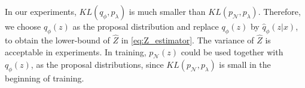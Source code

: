 In our experiments, $KL(q_\phi, p_\lambda)$ is much smaller than $KL(p_\mathcal{N}, p_\lambda)$. Therefore, we choose $q_\phi(z)$ as the proposal distribution and replace $q_\phi(z)$ by $\hat{q}_\phi(z|x)$, to obtain the lower-bound of $\hat{Z}$ in \cref{eq:Z_estimator}. The variance of $\hat{Z}$ is acceptable in experiments.  
In training, $p_\mathcal{N}(z)$ could be used together with $q_\phi(z)$, as the proposal distributions, since $KL(p_\mathcal{N}, p_\lambda)$ is small in the beginning of training.
 